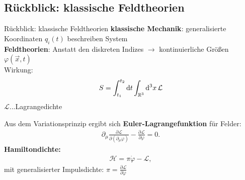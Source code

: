 \documentclass[mathserif]{beamer}
\theoremstyle{definition}
\begin{document}
\subsection{Rückblick: klassische Feldtheorien}
	\begin{frame}{Rückblick: klassische Feldtheorien}
		\textbf{klassische Mechanik}: generalisierte Koordinaten $q_i(t)$ beschreiben System\\
		\textbf{Feldtheorien}: Anstatt den diskreten Indizes $\rightarrow$ kontinuierliche Größen $\varphi(\vec{x},t)$\\
		\pause
		Wirkung:
		\begin{align}
			S=\int_{t_1}^{t_2}{\rm d}t\int_{\mathbb{R}^3}{\rm d}^3 x\, \mathcal{L}
		\end{align}
		$\mathcal{L}$...Lagrangedichte
	\end{frame}
	\begin{frame}
		Aus dem Variationsprinzip ergibt sich \textbf{Euler-Lagrangefunktion} für Felder:
		\begin{align}
			\partial_\mu \frac{\partial \mathcal{L}}{\partial (\partial_\mu \varphi)}-\frac{\partial \mathcal{L}}{\partial \varphi}=0.
		\end{align}
		\pause
		\textbf{Hamiltondichte:}
		\begin{align}
			\mathcal{H}=\pi\dot{\varphi}-\mathcal{L},
		\end{align}
		mit generalisierter Impulsdichte: $\pi=\frac{\partial\mathcal{L}}{\partial \dot{\varphi}}$
	\end{frame}
\end{document}
